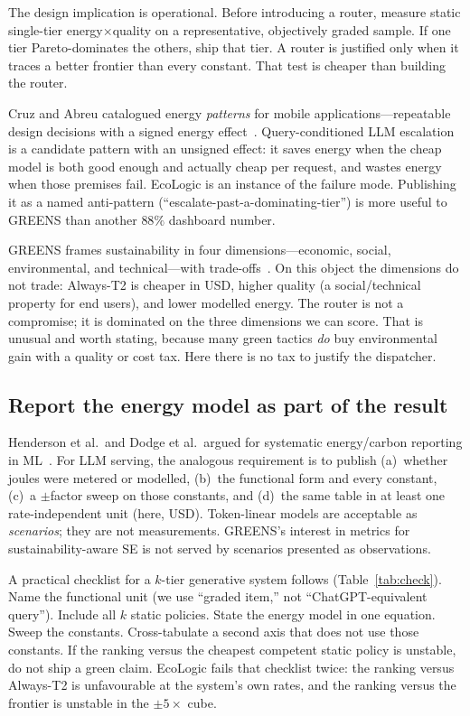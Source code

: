 \documentclass[10pt,conference]{IEEEtran}
\begin{document}
The design implication is operational. Before introducing a router, measure static single-tier energy$\times$quality on a representative, objectively graded sample. If one tier Pareto-dominates the others, ship that tier. A router is justified only when it traces a better frontier than every constant. That test is cheaper than building the router.

Cruz and Abreu catalogued energy \emph{patterns} for mobile applications---repeatable design decisions with a signed energy effect~\cite{cruz2021energy}. Query-conditioned LLM escalation is a candidate pattern with an unsigned effect: it saves energy when the cheap model is both good enough and actually cheap per request, and wastes energy when those premises fail. EcoLogic is an instance of the failure mode. Publishing it as a named anti-pattern (``escalate-past-a-dominating-tier'') is more useful to GREENS than another $88\%$ dashboard number.

GREENS frames sustainability in four dimensions---economic, social, environmental, and technical---with trade-offs~\cite{lago2015framing}. On this object the dimensions do not trade: Always-T2 is cheaper in USD, higher quality (a social/technical property for end users), and lower modelled energy. The router is not a compromise; it is dominated on the three dimensions we can score. That is unusual and worth stating, because many green tactics \emph{do} buy environmental gain with a quality or cost tax. Here there is no tax to justify the dispatcher.

\subsection{Report the energy model as part of the result}

Henderson et al.\ and Dodge et al.\ argued for systematic energy/carbon reporting in ML~\cite{henderson2020towards,dodge2022measuring}. For LLM serving, the analogous requirement is to publish (a)~whether joules were metered or modelled, (b)~the functional form and every constant, (c)~a $\pm$factor sweep on those constants, and (d)~the same table in at least one rate-independent unit (here, USD). Token-linear models are acceptable as \emph{scenarios}; they are not measurements. GREENS's interest in metrics for sustainability-aware SE is not served by scenarios presented as observations.

A practical checklist for a $k$-tier generative system follows (Table~\ref{tab:check}). Name the functional unit (we use ``graded item,'' not ``ChatGPT-equivalent query''). Include all $k$ static policies. State the energy model in one equation. Sweep the constants. Cross-tabulate a second axis that does not use those constants. If the ranking versus the cheapest competent static policy is unstable, do not ship a green claim. EcoLogic fails that checklist twice: the ranking versus Always-T2 is unfavourable at the system's own rates, and the ranking versus the frontier is unstable in the $\pm5\times$ cube.
\end{document}
